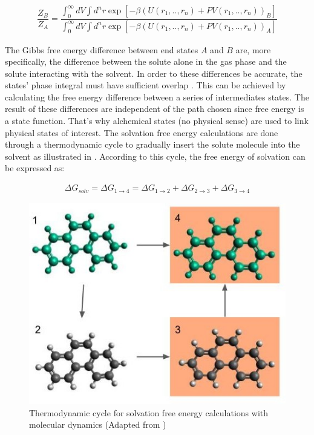 \begin{equation}
\label{eq:partiso}
\begin{aligned}
\dfrac{Z_{B}}{Z_{A}} = \dfrac{\int_{0}^{\infty} dV \int d^{n}r \exp \left[ -\beta \left(U(r_{1},..,r_{n}) + PV(r_{1},..,r_{n}) \right)_{B} \right]}{\int_{0}^{\infty} dV \int d^{n}r \exp \left[ -\beta \left(U(r_{1},..,r_{n}) + PV(r_{1},..,r_{n}) \right)_{A} \right]}
\end{aligned}
\end{equation}

The Gibbs free energy difference between end states $A$ and $B$ are, more specifically, the difference between the solute alone in the gas phase and the solute interacting with the solvent. In order to these differences be accurate, the states' phase integral must have sufficient overlap  \cite{klimovich}. This can be achieved by calculating the free energy difference between a series of intermediates states. The result of these differences are independent of the path chosen since free energy is a state function. That's why alchemical states (no physical sense) are used to link physical states of interest. The solvation free energy calculations are done through a thermodynamic cycle to gradually insert the solute molecule into the solvent as illustrated in . According to this cycle, the free energy of solvation can be expressed as:

\begin{equation}
\label{eq:freesolv}
\begin{aligned}
\Delta G_{solv} = \Delta G_{1 \rightarrow 4} = \Delta G_{1 \rightarrow 2} + \Delta G_{2 \rightarrow 3} + \Delta G_{3 \rightarrow 4}  
\end{aligned}
\end{equation}

\begin{figure}[th]
	\centering
	\includegraphics[scale=0.6]{Figures/cicclotermo.jpg}
	\caption{Thermodynamic cycle for solvation free energy calculations with molecular dynamics (Adapted from )}
	\label{thermcy}
\end{figure}

